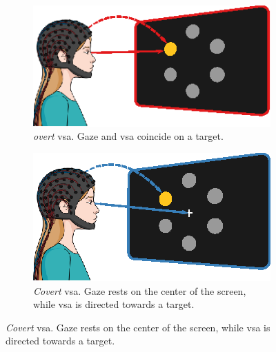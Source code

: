 \begin{figure}
  \begin{subfigure}{.45\textwidth}
    \includegraphics[width=\textwidth]{figures/gaze_independence/attention_overt.eps}
    \caption[Overt \ac{vsa}]{%
      \emph{overt} \ac{vsa}.
      Gaze and \ac{vsa} coincide on a target.
    }
    \label{fig:gaze/vsa/overt}
  \end{subfigure}\hfill%
  \begin{subfigure}{.45\textwidth}
    \includegraphics[width=\textwidth]{figures/gaze_independence/attention_covert.eps}
    \caption[Covert \ac{vsa}]{%
      \emph{Covert} \ac{vsa}.
      Gaze rests on the center of the screen, while \ac{vsa} is directed towards a target.
    }
    \label{fig:gaze/vsa/covert}
  \end{subfigure}


\end{figure}
